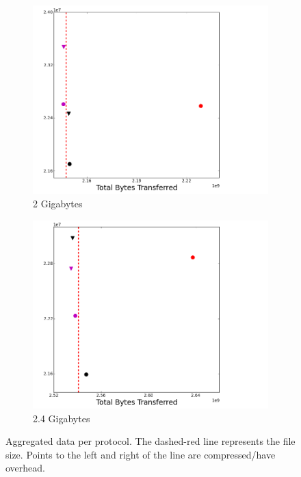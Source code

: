 \documentclass{sig-alternate-05-2015}
\begin{document}
\begin{figure}
\begin{subfigure}{.3\linewidth}
	\includegraphics[width=\linewidth]{img/speed_bytes/2G.png}
	\caption{2 Gigabytes}
	\label{speed_bytes_2G}
	\end{subfigure}
	\begin{subfigure}{.3\linewidth}
	\includegraphics[width=\linewidth]{img/speed_bytes/2_4G.png}
	\caption{2.4 Gigabytes}
	\label{speed_bytes_2_4G}
	\end{subfigure}
\caption{Aggregated data per protocol. The dashed-red line represents the file size. Points to the left and right of the line are compressed/have overhead.}
\label{fig:aggregate}
\end{figure}
\end{document}
